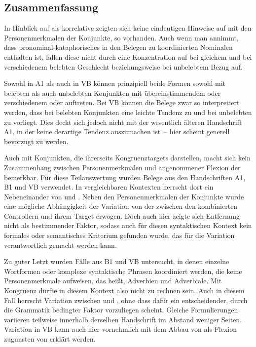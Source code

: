 
\subsection{Zusammenfassung}

In Hinblick auf   als
korrelative  zeigten sich keine eindeutigen
Hinweise auf  mit den Personenmerkmalen der
Konjunkte, so vorhanden. Auch wenn man annimmt, dass
pronominal-kataphorisches  in den Belegen zu
koordinierten Nominalen enthalten ist, fallen diese nicht
durch eine Konzentration auf  bei gleichem und  bei
verschiedenem belebten Geschlecht beziehungsweise bei
unbelebtem Bezug auf.

Sowohl in A1 als auch in VB können prinzipiell beide Formen sowohl mit
belebten als auch unbelebten Konjunkten mit
über\-einstim\-mendem oder verschiedenem  oder 
auftreten. Bei VB können die Belege zwar so interpretiert werden, dass bei
belebten Konjunkten eine leichte Tendenz zu  und bei unbelebten zu
 vorliegt. Dies deckt sich jedoch nicht mit der
wesentlich älteren Handschrift A1, in der keine derartige Tendenz auszumachen
ist~-- hier scheint generell  bevorzugt zu werden.

Auch mit Konjunkten, die ihrerseits Kongruenztargets darstellen,
macht sich kein Zusammen\-hang zwischen Personen\-merkmalen
und angenommener Flexion der  bemerkbar. Für diese
Teilauswertung wurden Belege aus den Handschriften A1, B1 und VB verwendet. In
vergleichbaren Kontexten herrscht dort ein Nebeneinander von  und
. Neben den Personenmerkmalen der Konjunkte wurde eine mögliche
Abhängigkeit der Variation von der  zwischen den kombinierten
Controllern und ihrem Target erwogen. Doch auch hier zeigte sich
Entfernung nicht als bestimmender Faktor, sodass auch für diesen syntaktischen
Kontext kein formales oder semantisches Kriterium gefunden wurde, das für die
Variation verantwortlich gemacht werden kann.

Zu guter Letzt wurden Fälle aus B1 und VB untersucht, in denen einzelne
Wortformen oder komplexe syntaktische Phrasen koordiniert
werden, die keine Personenmerkmale aufweisen, das heißt,
Adverbien und Adverbiale. Mit Kongruenz dürfte in
diesem Kontext also nicht zu rechnen sein. Auch in diesem Fall herrscht
Variation zwischen  und , ohne dass dafür ein
entscheidender, durch die Grammatik bedingter Faktor vorzuliegen scheint.
Gleiche Formulierungen variieren teilweise innerhalb derselben Handschrift im
Abstand weniger Seiten. Variation in VB kann auch hier vornehmlich mit dem
Abbau von  als Flexion zugunsten von  erklärt werden.
